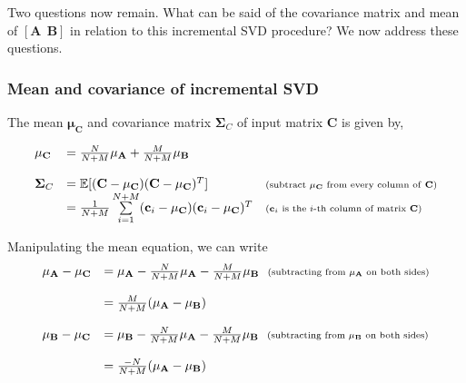 Two questions now remain.  What can be said of the covariance matrix and mean of $\left[{\mathbf{A}} \ \ \mathbf{B}\right]$ in relation to this incremental SVD procedure?  We now address these questions.


\subsubsection{Mean and covariance of incremental SVD}
The mean $\mathbf{\mu}_\mathbf{C}$ and covariance matrix $\mathbf{\Sigma}_C$ of input matrix $\mathbf{C}$ is given by,

\begin{equation}
\begin{array}{llll}
\mathbf{\mu}_\mathbf{C} &= \frac{N}{N+M}\mathbf{\mu}_\mathbf{A} + \frac{M}{N+M}\mathbf{\mu}_\mathbf{B}\\\\
\mathbf{\Sigma}_C &= \mathbb{E}[(\mathbf{C}-\mathbf{\mu}_\mathbf{C})(\mathbf{C}-\mu_\mathbf{C})^T] & \textrm{\scriptsize (subtract $\mathbf{\mu}_\mathbf{C}$ from every column of \textbf{C})}\\
&=\frac{1}{N+M}\sum\limits_{i=1}^{N+M} (\mathbf{c}_i-\mathbf{\mu}_\mathbf{C})(\mathbf{c}_i-\mu_\mathbf{C})^T & \textrm{\scriptsize ($\mathbf{c}_i$ is the $i$-th column of matrix $\mathbf{C}$)}\\
\end{array}
\end{equation}

Manipulating the mean equation, we can write
\begin{equation}
\begin{array}{llll}
\mathbf{\mu}_\mathbf{A} -\mathbf{\mu}_\mathbf{C} &= \mathbf{\mu}_\mathbf{A} - \frac{N}{N+M}\mathbf{\mu}_\mathbf{A} - \frac{M}{N+M}\mathbf{\mu}_\mathbf{B} \ \ \scriptsize{\textrm{(subtracting from $\mathbf{\mu}_\mathbf{A}$ on both sides)}}\\\\

&=\frac{M}{N+M}(\mathbf{\mu}_\mathbf{A} - \mathbf{\mu}_\mathbf{B})\\\\

\mathbf{\mu}_\mathbf{B} -\mathbf{\mu}_\mathbf{C} &= \mathbf{\mu}_\mathbf{B} - \frac{N}{N+M}\mathbf{\mu}_\mathbf{A} - \frac{M}{N+M}\mathbf{\mu}_\mathbf{B} \ \ \scriptsize{\textrm{(subtracting from $\mathbf{\mu}_\mathbf{B}$ on both sides)}}\\\\

&=\frac{-N}{N+M}(\mathbf{\mu}_\mathbf{A} - \mathbf{\mu}_\mathbf{B})
\end{array}
\end{equation}


